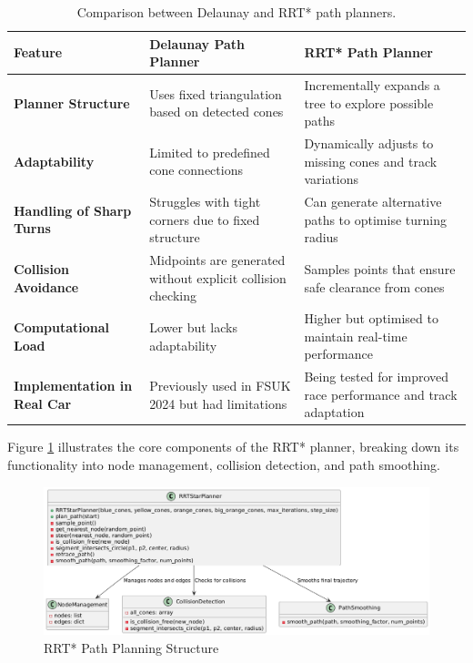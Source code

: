 \documentclass[a4paper,11pt]{report}
\begin{document}
\begin{table}[h]
    \centering
    \small
    \begin{tabular}{|p{3cm}|p{5cm}|p{5cm}|}
        \hline
        \textbf{Feature} & \textbf{Delaunay Path Planner} & \textbf{RRT* Path Planner} \\
        \hline
        \textbf{Planner Structure} & Uses fixed triangulation based on detected cones & Incrementally expands a tree to explore possible paths \\
        \hline
        \textbf{Adaptability} & Limited to predefined cone connections & Dynamically adjusts to missing cones and track variations \\
        \hline
        \textbf{Handling of Sharp Turns} & Struggles with tight corners due to fixed structure & Can generate alternative paths to optimise turning radius \\
        \hline
        \textbf{Collision Avoidance} & Midpoints are generated without explicit collision checking & Samples points that ensure safe clearance from cones \\
        \hline
        \textbf{Computational Load} & Lower but lacks adaptability & Higher but optimised to maintain real-time performance \\
        \hline
        \textbf{Implementation in Real Car} & Previously used in FSUK 2024 but had limitations & Being tested for improved race performance and track adaptation \\
        \hline
    \end{tabular}
    \caption{Comparison between Delaunay and RRT* path planners.}
    \label{tab:delaunay_vs_rrt}
\end{table}

Figure \ref{fig:rrtstar_structure} illustrates the core components of the RRT* planner, breaking down its functionality into node management, collision detection, and path smoothing.

\begin{figure}[h]
    \centering
    \includegraphics[width=\textwidth]{Images/rrt.png}
    \caption{RRT* Path Planning Structure}
    \label{fig:rrtstar_structure}
\end{figure}
\end{document}
